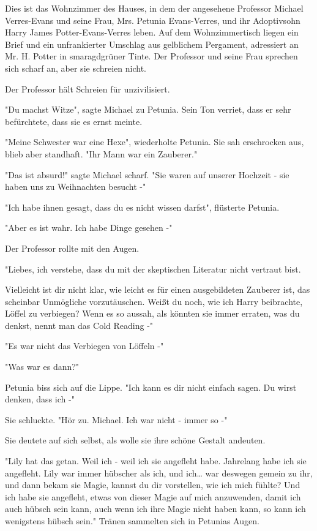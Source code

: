 {Dies ist das Wohnzimmer des Hauses, in dem der angesehene Professor Michael Verres-Evans und seine Frau, Mrs. Petunia Evans-Verres, und ihr Adoptivsohn Harry James Potter-Evans-Verres leben. Auf dem Wohnzimmertisch liegen ein Brief und ein unfrankierter Umschlag aus gelblichem Pergament, adressiert an Mr. H. Potter in smaragdgrüner Tinte. Der Professor und seine Frau sprechen sich scharf an, aber sie schreien nicht.

Der Professor hält Schreien für unzivilisiert.

"Du machst Witze", sagte Michael zu Petunia. Sein Ton verriet, dass er sehr befürchtete, dass sie es ernst meinte.

"Meine Schwester war eine Hexe", wiederholte Petunia. Sie sah erschrocken aus, blieb aber standhaft. "Ihr Mann war ein Zauberer."

"Das ist absurd!" sagte Michael scharf. "Sie waren auf unserer Hochzeit - sie haben uns zu Weihnachten besucht -"

"Ich habe ihnen gesagt, dass du es nicht wissen darfst", flüsterte Petunia.

"Aber es ist wahr. Ich habe Dinge gesehen -"

Der Professor rollte mit den Augen.

"Liebes, ich verstehe, dass du mit der skeptischen Literatur nicht vertraut bist.

Vielleicht ist dir nicht klar, wie leicht es für einen ausgebildeten Zauberer ist, das scheinbar Unmögliche vorzutäuschen. Weißt du noch, wie ich Harry beibrachte, Löffel zu verbiegen? Wenn es so aussah, als könnten sie immer erraten, was du denkst, nennt man das Cold Reading -"

"Es war nicht das Verbiegen von Löffeln -"

"Was war es dann?"

Petunia biss sich auf die Lippe. "Ich kann es dir nicht einfach sagen. Du wirst denken, dass ich -"

Sie schluckte. "Hör zu. Michael. Ich war nicht - immer so -"

Sie deutete auf sich selbst, als wolle sie ihre schöne Gestalt andeuten.

"Lily hat das getan. Weil ich - weil ich sie angefleht habe. Jahrelang habe ich sie angefleht. Lily war immer hübscher als ich, und ich… war deswegen gemein zu ihr, und dann bekam sie Magie, kannst du dir vorstellen, wie ich mich fühlte? Und ich habe sie angefleht, etwas von dieser Magie auf mich anzuwenden, damit ich auch hübsch sein kann, auch wenn ich ihre Magie nicht haben kann, so kann ich wenigstens hübsch sein." Tränen sammelten sich in Petunias Augen.

}
